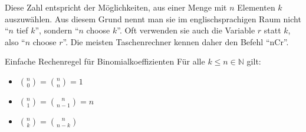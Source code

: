 Diese Zahl entspricht der Möglichkeiten, aus einer Menge mit \(n\) Elementen \(k\) auszuwählen. Aus diesem Grund nennt man sie im englischsprachigen Raum nicht ``\(n\) tief \(k\)'', sondern ``\(n\) choose \(k\)''. Oft verwenden sie auch die Variable \(r\) statt \(k\), also ``\(n\) choose \(r\)''. Die meisten Taschenrechner kennen daher den Befehl ``nCr''.

\begin{satz}
    {Einfache Rechenregel für Binomialkoeffizienten}{}
    Für alle \(k \leq n \in \mathbb{N}\) gilt:

    \begin{itemize}
        \item \(\binom{n}{0} = \binom{n}{n} = 1\)
        \item \(\binom{n}{1} = \binom{n}{n-1} = n\)
        \item \(\binom{n}{k} = \binom{n}{n-k}\)
    \end{itemize}

\end{satz}

